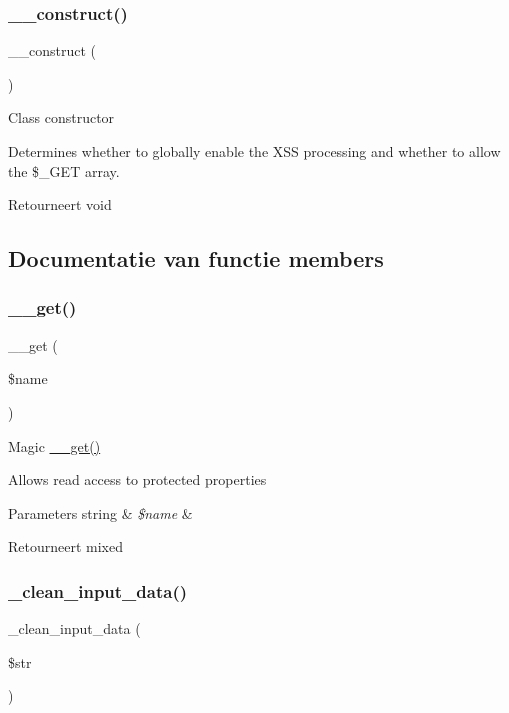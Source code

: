 \subsubsection{\texorpdfstring{\_\_construct()}{\_\_construct()}}
{\footnotesize\ttfamily \+\_\+\+\_\+construct (\begin{DoxyParamCaption}{ }\end{DoxyParamCaption})}

Class constructor

Determines whether to globally enable the X\+SS processing and whether to allow the \$\+\_\+\+G\+ET array.

\begin{DoxyReturn}{Retourneert}
void 
\end{DoxyReturn}


\subsection{Documentatie van functie members}
\mbox{\label{class_c_i___input_abc8e9e31bb15c8a44c3210ec551407c8}} 
\subsubsection{\texorpdfstring{\_\_get()}{\_\_get()}}
{\footnotesize\ttfamily \+\_\+\+\_\+get (\begin{DoxyParamCaption}\item[{}]{\$name }\end{DoxyParamCaption})}

Magic \mbox{\hyperlink{class_c_i___input_abc8e9e31bb15c8a44c3210ec551407c8}{\+\_\+\+\_\+get()}}

Allows read access to protected properties


\begin{DoxyParams}[1]{Parameters}
string & {\em \$name} & \\
\hline
\end{DoxyParams}
\begin{DoxyReturn}{Retourneert}
mixed 
\end{DoxyReturn}
\mbox{\label{class_c_i___input_a9c594152e7b189a290f6425df8712b73}} 
\subsubsection{\texorpdfstring{\_clean\_input\_data()}{\_clean\_input\_data()}}
{\footnotesize\ttfamily \+\_\+clean\+\_\+input\+\_\+data (\begin{DoxyParamCaption}\item[{}]{\$str }\end{DoxyParamCaption})\hspace{0.3cm}{\ttfamily [protected]}}

